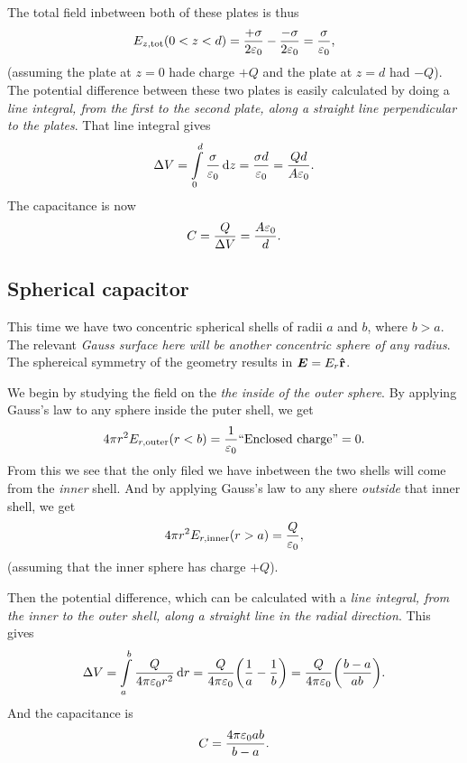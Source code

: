 \documentclass[11pt,letter, swedish, english
]{article}
\let\oldint\int
\renewcommand{\int}{\oldint\limits}
\newcommand{\enaught}{\ensuremath\varepsilon_0}
\begin{document}
The total field inbetween both of these plates is thus
\begin{equation}
E_{z, \text{tot}}(0<z<d)
=\frac{+\sigma}{2\enaught}-\frac{-\sigma}{2\enaught}
=\frac{\sigma}{\enaught},
\end{equation}
(assuming the plate at $z=0$ hade charge $+Q$ and the plate at $z=d$
had $-Q$). The potential difference between these two plates is easily
calculated by doing a \textit{line integral, from the first to the
  second plate, along a straight line perpendicular to the
  plates}. That line integral gives
\begin{equation}
\Delta{V}=\int_0^d\frac{\sigma}{\enaught}\id{z}
=\frac{\sigma d}{\enaught}
=\frac{Qd}{A\enaught}.
\end{equation}
The capacitance is now
\begin{equation}
C=\frac{Q}{\Delta{V}}=\frac{A\enaught}{d}.
\end{equation}


\subsection{Spherical capacitor}
This time we have two concentric spherical shells of radii $a$ and
$b$, where $b>a$. The relevant \textit{Gauss surface here will be
  another concentric sphere of any radius}. The sphereical symmetry of
the geometry results in $\vb*E=E_r\vu{r}$.

We begin by studying the field on the \emph{the inside of the outer
  sphere}. By applying Gauss's law to any sphere inside the puter
shell, we get
\begin{equation}
4\pi r^2 E_{r, \text{outer}}(r<b)=\frac{1}{\enaught}\text{``Enclosed charge''}=0.
\end{equation}
From this we see that the only filed we have inbetween the two shells
will come from the \emph{inner} shell. And by applying Gauss's law to
any shere \emph{outside} that inner shell, we get
\begin{equation}
4\pi r^2 E_{r, \text{inner}}(r>a)=\frac{Q}{\enaught},
\end{equation}
(assuming that the inner sphere has charge $+Q$).

Then the potential difference, which can be calculated with a
\textit{line integral, from the inner to the outer shell, along a
  straight line in the radial direction}. This gives
\begin{equation}
\Delta{V}=\int_a^b\frac{Q}{4\pi\enaught r^2}\id{r}
=\frac{Q}{4\pi\enaught}\qty(\frac{1}{a}-\frac{1}{b})
=\frac{Q}{4\pi\enaught}\qty(\frac{b-a}{ab}).
\end{equation}
And the capacitance is
\begin{equation}
C=\frac{4\pi\enaught ab}{b-a}.
\end{equation}
\end{document}

